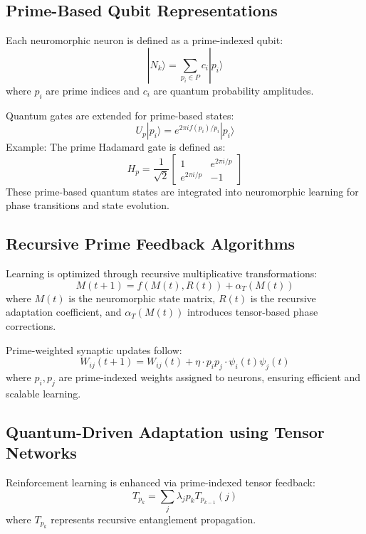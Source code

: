 \documentclass{article}
\theoremstyle{plain}
\begin{document}
\begin{itemize}
\begin{itemize}
\subsection{Prime-Based Qubit Representations}
Each neuromorphic neuron is defined as a prime-indexed qubit:
\begin{equation}
|N_k\rangle = \sum_{p_i \in P} c_i |p_i\rangle
\end{equation}
where $p_i$ are prime indices and $c_i$ are quantum probability amplitudes.

Quantum gates are extended for prime-based states:
\begin{equation}
U_p |p_i\rangle = e^{2\pi i f(p_i) / p_i} |p_i\rangle
\end{equation}
Example: The prime Hadamard gate is defined as:
\begin{equation}
H_p = \frac{1}{\sqrt{2}} \begin{bmatrix} 1 & e^{2\pi i/p} \\ e^{2\pi i/p} & -1 \end{bmatrix}
\end{equation}
These prime-based quantum states are integrated into neuromorphic learning for phase transitions and state evolution.

\subsection{Recursive Prime Feedback Algorithms}
Learning is optimized through recursive multiplicative transformations:
\begin{equation}
M(t+1) = f(M(t), R(t)) + \alpha_T(M(t))
\end{equation}
where $M(t)$ is the neuromorphic state matrix, $R(t)$ is the recursive adaptation coefficient, and $\alpha_T(M(t))$ introduces tensor-based phase corrections.

Prime-weighted synaptic updates follow:
\begin{equation}
W_{ij}(t+1) = W_{ij}(t) + \eta \cdot p_i p_j \cdot \psi_i(t) \psi_j(t)
\end{equation}
where $p_i, p_j$ are prime-indexed weights assigned to neurons, ensuring efficient and scalable learning.

\subsection{Quantum-Driven Adaptation using Tensor Networks}
Reinforcement learning is enhanced via prime-indexed tensor feedback:
\begin{equation}
T_{p_k} = \sum_{j} \lambda_j p_k T_{p_{k-1}}(j)
\end{equation}
where $T_{p_k}$ represents recursive entanglement propagation.


\end{itemize}
\end{itemize}
\end{document}
